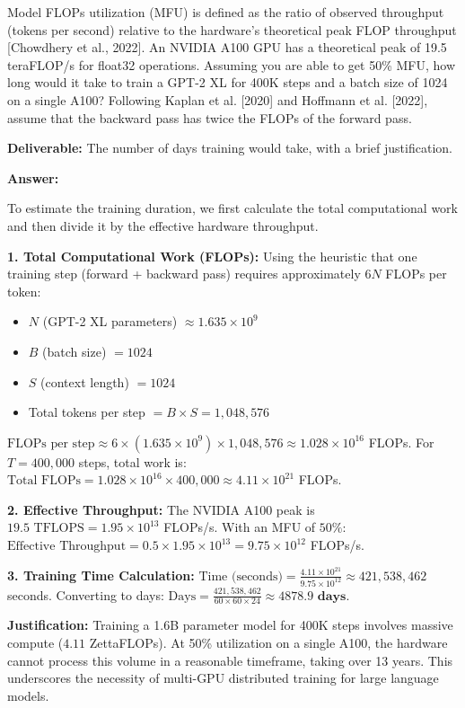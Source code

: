 \begin{questionbox}
    Model FLOPs utilization (MFU) is defined as the ratio of observed throughput (tokens per second) relative to the hardware's theoretical peak FLOP throughput [Chowdhery et al., 2022]. An NVIDIA A100 GPU has a theoretical peak of 19.5 teraFLOP/s for float32 operations. Assuming you are able to get 50\% MFU, how long would it take to train a GPT-2 XL for 400K steps and a batch size of 1024 on a single A100? Following Kaplan et al. [2020] and Hoffmann et al. [2022], assume that the backward pass has twice the FLOPs of the forward pass.

    \textbf{Deliverable:} The number of days training would take, with a brief justification.
\end{questionbox}

\begin{answerbox}
    \textbf{Answer:}

    To estimate the training duration, we first calculate the total computational work and then divide it by the effective hardware throughput.

    \textbf{1. Total Computational Work (FLOPs):}
    Using the heuristic that one training step (forward + backward pass) requires approximately $6N$ FLOPs per token:
    \begin{itemize}
        \item $N$ (GPT-2 XL parameters) $\approx 1.635 \times 10^9$
        \item $B$ (batch size) $= 1024$
        \item $S$ (context length) $= 1024$
        \item Total tokens per step $= B \times S = 1,048,576$
    \end{itemize}
    $\text{FLOPs per step} \approx 6 \times (1.635 \times 10^9) \times 1,048,576 \approx 1.028 \times 10^{16}$ FLOPs.
    For $T = 400,000$ steps, total work is:
    $\text{Total FLOPs} = 1.028 \times 10^{16} \times 400,000 \approx 4.11 \times 10^{21}$ FLOPs.

    \textbf{2. Effective Throughput:}
    The NVIDIA A100 peak is $19.5 \text{ TFLOPS} = 1.95 \times 10^{13}$ FLOPs/s. With an MFU of $50\%$:
    $\text{Effective Throughput} = 0.5 \times 1.95 \times 10^{13} = 9.75 \times 10^{12}$ FLOPs/s.

    \textbf{3. Training Time Calculation:}
    $\text{Time (seconds)} = \frac{4.11 \times 10^{21}}{9.75 \times 10^{12}} \approx 421,538,462$ seconds.
    Converting to days:
    $\text{Days} = \frac{421,538,462}{60 \times 60 \times 24} \approx \mathbf{4878.9 \text{ days}}$.

    \textbf{Justification:}
    Training a 1.6B parameter model for 400K steps involves massive compute ($4.11$ ZettaFLOPs). At 50\% utilization on a single A100, the hardware cannot process this volume in a reasonable timeframe, taking over 13 years. This underscores the necessity of multi-GPU distributed training for large language models.

\end{answerbox}

